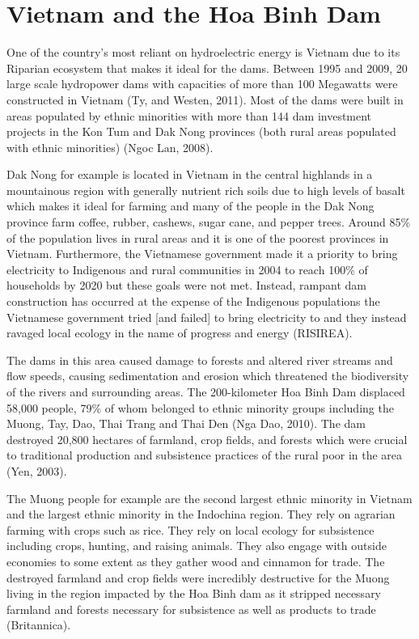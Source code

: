 \documentclass{book}\usepackage{knitr}
\begin{document}
\section{Vietnam and the Hoa Binh Dam}
  One of the country's most reliant on hydroelectric energy is Vietnam due to its Riparian ecosystem that makes it ideal for the dams. Between 1995 and 2009, 20 large scale hydropower dams with capacities of more than 100 Megawatts were constructed in Vietnam (Ty, and Westen, 2011). Most of the dams were built in areas populated by ethnic minorities with more than 144 dam investment projects in the Kon Tum and Dak Nong provinces (both rural areas populated with ethnic minorities) (Ngoc Lan, 2008). 
  
  Dak Nong for example is located in Vietnam in the central highlands in a mountainous region with generally nutrient rich soils due to high levels of basalt which makes it ideal for farming and many of the people in the Dak Nong province farm coffee, rubber, cashews, sugar cane, and pepper trees. Around 85\% of the population lives in rural areas and it is one of the poorest provinces in Vietnam. Furthermore, the Vietnamese government made it a priority to bring electricity to Indigenous and rural communities in 2004 to reach 100\% of households by 2020 but these goals were not met. Instead, rampant dam construction has occurred at the expense of the Indigenous populations the Vietnamese government tried [and failed] to bring electricity to and they instead ravaged local ecology in the name of progress and energy (RISIREA). 
  
  The dams in this area caused damage to forests and altered river streams and flow speeds, causing sedimentation and erosion which threatened the biodiversity of the rivers and surrounding areas. The 200-kilometer Hoa Binh Dam displaced 58,000 people, 79\% of whom belonged to ethnic minority groups including the Muong, Tay, Dao, Thai Trang and Thai Den (Nga Dao, 2010). The dam destroyed 20,800 hectares of farmland, crop fields, and forests which were crucial to traditional production and subsistence practices of the rural poor in the area (Yen, 2003). 
  
  The Muong people for example are the second largest ethnic minority in Vietnam and the largest ethnic minority in the Indochina region. They rely on agrarian farming with crops such as rice. They rely on local ecology for subsistence including crops, hunting, and raising animals. They also engage with outside economies to some extent as they gather wood and cinnamon for trade. The destroyed farmland and crop fields were incredibly destructive for the Muong living in the region impacted by the Hoa Binh dam as it stripped necessary farmland and forests necessary for subsistence as well as products to trade (Britannica). 
  
\end{document}
